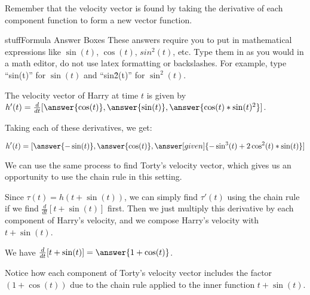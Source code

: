 \documentclass{ximera}
\begin{document}
\begin{problem}
    Remember that the velocity vector is found by taking the derivative of each component function to form a new vector function. 
    
    \begin{expandable}{stuff}{Formula Answer Boxes}
        These answers require you to put in mathematical expressions like $\sin(t)$, $\cos(t)$, $sin^2(t)$, etc. Type them in as you would in a math editor, do not use latex formatting or backslashes. For example, type ``sin(t)'' for $\sin(t)$ and ``sin\^2(t)'' for $\sin^2(t)$.
    \end{expandable}

    The velocity vector of Harry at time $t$ is given by $h'(t)=\frac{d}{dt}[ \answer{\cos(t)}, \answer{\sin(t)}, \answer{\cos(t)*\sin(t)^2}]$.
    
    Taking each of these derivatives, we get:

    \[h'(t)=[ \answer{-\sin(t)}, \answer{\cos(t)}, \answer[given]{-\sin^3(t)+2\cos^2(t)*\sin(t)}]\]
\end{problem}

We can use the same process to find Torty's velocity vector, which gives us an opportunity to use the chain rule in this setting.

\begin{problem}
    Since $\tau(t)=h(t+\sin(t))$, we can simply find $\tau'(t)$ using the chain rule if we find $\frac{d}{dt}[t+\sin(t)]$ first. Then we just multiply this derivative by each component of Harry's velocity, and we compose Harry's velocity with $t+\sin(t)$.

    We have $\frac{d}{dt}[t+\sin(t)]=\answer{1+\cos(t)}$.
    
    \begin{feedback}
        Notice how each component of Torty's velocity vector includes the factor $(1+\cos(t))$ due to the chain rule applied to the inner function $t+\sin(t)$.
    \end{feedback}

\end{problem}
\end{document}
